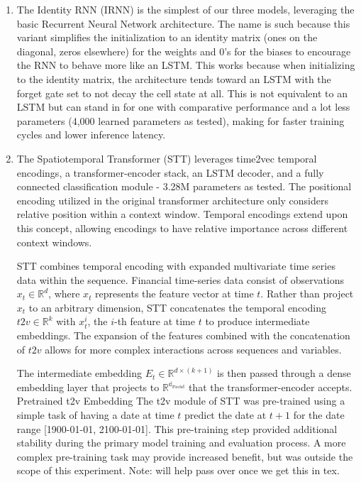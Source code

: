 \documentclass[10pt,twocolumn,letterpaper]{article}
\begin{document}
    \begin{enumerate}
        \item{The Identity RNN (IRNN) is the simplest of our three models, leveraging the basic Recurrent Neural Network architecture. The name is such because this variant simplifies the initialization to an identity matrix (ones on the diagonal, zeros elsewhere) for the weights and 0’s for the biases to encourage the RNN to behave more like an LSTM. This works because when initializing to the identity matrix, the architecture tends toward an LSTM with the forget gate set to not decay the cell state at all. This is not equivalent to an LSTM but can stand in for one with comparative performance and a lot less parameters (4,000 learned parameters as tested), making for faster training cycles and lower inference latency.}
        \item{The Spatiotemporal Transformer (STT) leverages time2vec temporal encodings, a transformer-encoder stack, an LSTM decoder, and a fully connected classification module - 3.28M parameters as tested. The positional encoding utilized in the original transformer architecture only considers relative position within a context window. Temporal encodings extend upon this concept, allowing encodings to have relative importance across different context windows.

STT combines temporal encoding with expanded multivariate time series data within the sequence. Financial time-series data consist of observations $x_t \in \mathbb{R}^d$, where $x_t$ represents the feature vector at time $t$. Rather than project $x_t$ to an arbitrary dimension, STT concatenates the temporal encoding $t2v \in \mathbb{R}^k$ with $x^i_t$, the $i$-th feature at time $t$ to produce intermediate embeddings. The expansion of the features combined with the concatenation of $t2v$ allows for more complex interactions across sequences and variables.

            The intermediate embedding $E_t \in \mathbb{R}^{d \times (k + 1)}$ is then passed through a dense embedding layer that projects to $\mathbb{R^{d_{model}}}$ that the transformer-encoder accepts.
Pretrained t2v Embedding
The t2v module of STT was pre-trained using a simple task of having a date at time $t$ predict the date at $t+1$ for the date range [1900-01-01, 2100-01-01]. This pre-training step provided additional stability during the primary model training and evaluation process. A more complex pre-training task may provide increased benefit, but was outside the scope of this experiment.
            Note: will help pass over once we get this in tex.}


\end{enumerate}
\end{document}
